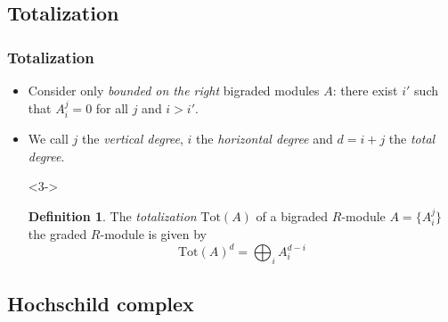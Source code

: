 \documentclass{beamer}
\theoremstyle{definition}
\newtheorem{defi}{Definition}
\newcommand{\Tot}{\mathrm{Tot}}
\begin{document}
\subsection{Totalization}
\begin{frame}
\frametitle{Totalization}
\begin{itemize}
\item<1-> Consider only \emph{bounded on the right} bigraded modules $A$: there exist $i'$ such that $A_i^j=0$ for all $j$ and $i>i'$. %
\item<2-> We call $j$ the \emph{vertical degree}, $i$ the \emph{horizontal degree} and $d=i+j$ the \emph{total degree}.
\item[]<3->
\begin{defi}
The \emph{totalization} $\Tot(A)$ of a bigraded $R$-module $A = \{A^j_i \}$ the graded $R$-module is given by
\[\Tot(A)^d =
\bigoplus_{i}A^{d-i}_i \]%
\end{defi}
\end{itemize}
\end{frame}

\subsection{Hochschild complex}
\end{document}
